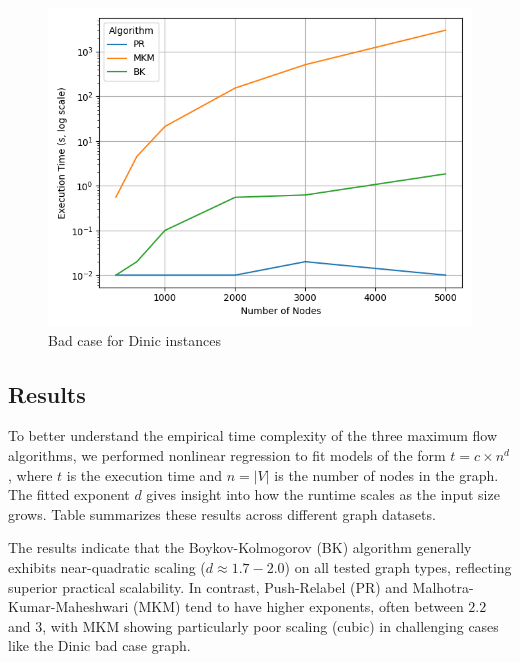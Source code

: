 \begin{figure}[htbp]
    \centering
    \includegraphics[width=0.8\linewidth]{figures/dinic.png}
    \caption{Bad case for Dinic instances}
    \label{fig:dinic}
\end{figure}

\subsection{Results}

To better understand the empirical time complexity of the three maximum flow algorithms, we performed nonlinear regression to fit models of the form $ t = c \times n^d $, where  $t$  is the execution time and  $n = |V|$  is the number of nodes in the graph. The fitted exponent  $d$  gives insight into how the runtime scales as the input size grows. Table  summarizes these results across different graph datasets.

The results indicate that the Boykov-Kolmogorov (BK) algorithm generally exhibits near-quadratic scaling ($ d \approx 1.7 - 2.0 $) on all tested graph types, reflecting superior practical scalability. In contrast, Push-Relabel (PR) and Malhotra-Kumar-Maheshwari (MKM) tend to have higher exponents, often between $2.2$ and $3$, with MKM showing particularly poor scaling (cubic) in challenging cases like the Dinic bad case graph.

